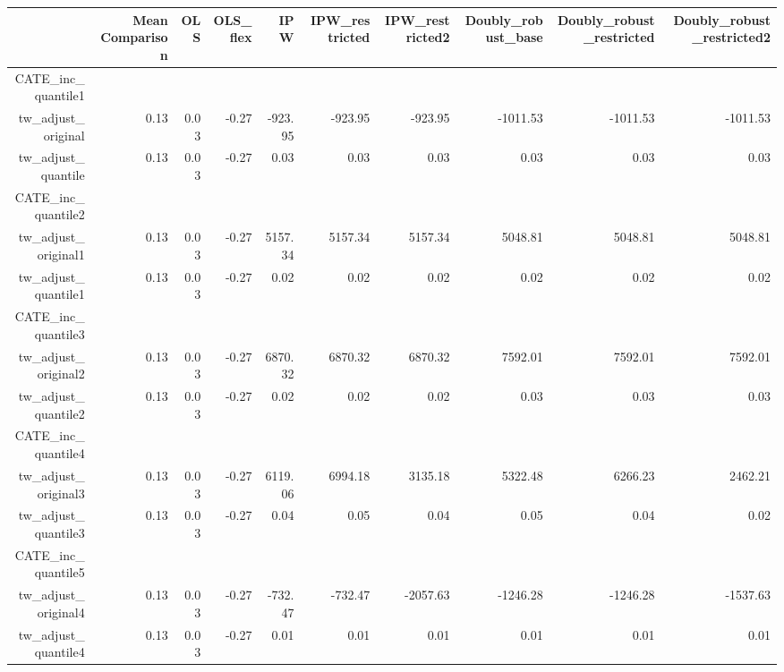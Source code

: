 \begin{table}[ht]
\centering
\begin{tabular}{rrrrrrrrrr}
  \hline
 & Mean Comparison & OLS & OLS\_flex & IPW & IPW\_restricted & IPW\_restricted2 & Doubly\_robust\_base & Doubly\_robust\_restricted & Doubly\_robust\_restricted2 \\ 
  \hline
CATE\_inc\_quantile1 &  &  &  &  &  &  &  &  &  \\ 
  tw\_adjust\_original & 0.13 & 0.03 & -0.27 & -923.95 & -923.95 & -923.95 & -1011.53 & -1011.53 & -1011.53 \\ 
  tw\_adjust\_quantile & 0.13 & 0.03 & -0.27 & 0.03 & 0.03 & 0.03 & 0.03 & 0.03 & 0.03 \\ 
  CATE\_inc\_quantile2 &  &  &  &  &  &  &  &  &  \\ 
  tw\_adjust\_original1 & 0.13 & 0.03 & -0.27 & 5157.34 & 5157.34 & 5157.34 & 5048.81 & 5048.81 & 5048.81 \\ 
  tw\_adjust\_quantile1 & 0.13 & 0.03 & -0.27 & 0.02 & 0.02 & 0.02 & 0.02 & 0.02 & 0.02 \\ 
  CATE\_inc\_quantile3 &  &  &  &  &  &  &  &  &  \\ 
  tw\_adjust\_original2 & 0.13 & 0.03 & -0.27 & 6870.32 & 6870.32 & 6870.32 & 7592.01 & 7592.01 & 7592.01 \\ 
  tw\_adjust\_quantile2 & 0.13 & 0.03 & -0.27 & 0.02 & 0.02 & 0.02 & 0.03 & 0.03 & 0.03 \\ 
  CATE\_inc\_quantile4 &  &  &  &  &  &  &  &  &  \\ 
  tw\_adjust\_original3 & 0.13 & 0.03 & -0.27 & 6119.06 & 6994.18 & 3135.18 & 5322.48 & 6266.23 & 2462.21 \\ 
  tw\_adjust\_quantile3 & 0.13 & 0.03 & -0.27 & 0.04 & 0.05 & 0.04 & 0.05 & 0.04 & 0.02 \\ 
  CATE\_inc\_quantile5 &  &  &  &  &  &  &  &  &  \\ 
  tw\_adjust\_original4 & 0.13 & 0.03 & -0.27 & -732.47 & -732.47 & -2057.63 & -1246.28 & -1246.28 & -1537.63 \\ 
  tw\_adjust\_quantile4 & 0.13 & 0.03 & -0.27 & 0.01 & 0.01 & 0.01 & 0.01 & 0.01 & 0.01 \\ 
   \hline
\end{tabular}
\end{table}
